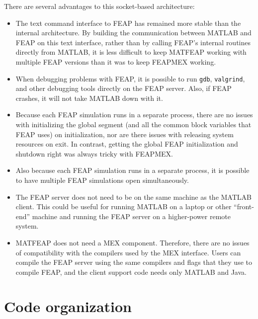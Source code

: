 \documentclass{report}
\begin{document}
There are several advantages to this socket-based architecture:
\begin{itemize}
\item
  The text command interface to FEAP has remained more stable
  than the internal architecture.  By building the communication between
  MATLAB and FEAP on this text interface, rather than by calling FEAP's
  internal routines directly from MATLAB, it is less difficult to keep
  MATFEAP working with multiple FEAP versions than it was to keep FEAPMEX
  working.

\item
  When debugging problems with FEAP, it is possible to run {\tt gdb},
  {\tt valgrind}, and other debugging tools directly on the FEAP
  server.  Also, if FEAP crashes, it will not take MATLAB down with
  it.

\item
  Because each FEAP simulation runs in a separate process, there are no
  issues with initializing the global segment (and all the common
  block variables that FEAP uses) on initialization, nor are there
  issues with releasing system resources on exit.  In contrast,
  getting the global FEAP initialization and shutdown right was always
  tricky with FEAPMEX.

\item
  Also because each FEAP simulation runs in a separate process, it is
  possible to have multiple FEAP simulations open simultaneously.

\item
  The FEAP server does not need to be on the same machine as the MATLAB
  client.  This could be useful for running MATLAB on a laptop or other
  ``front-end'' machine and running the FEAP server on a higher-power
  remote system.

\item
  MATFEAP does not need a MEX component.  Therefore, there are no
  issues of compatibility with the compilers used by the MEX
  interface.  Users can compile the FEAP server using the same
  compilers and flags that they use to compile FEAP, and the client
  support code needs only MATLAB and Java.

\end{itemize}

\section{Code organization}
\end{document}
